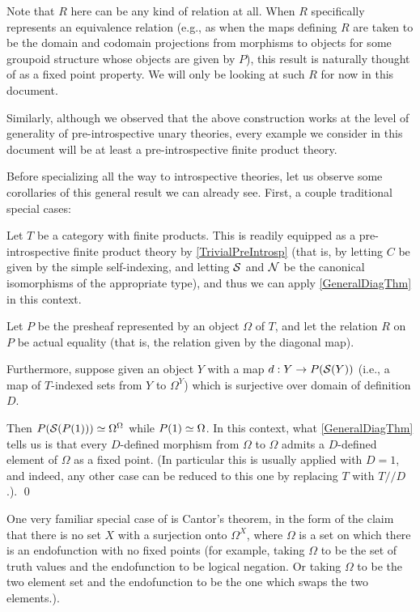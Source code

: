 Note that $R$ here can be any kind of relation at all. When $R$ specifically represents an equivalence relation (e.g., as when the maps defining $R$ are taken to be the domain and codomain projections from morphisms to objects for some groupoid structure whose objects are given by $P$), this result is naturally thought of as a fixed point property. We will only be looking at such $R$ for now in this document.

Similarly, although we observed that the above construction works at the level of generality of pre-introspective unary theories, every example we consider in this document will be at least a pre-introspective finite product theory.

Before specializing all the way to introspective theories, let us observe some corollaries of this general result we can already see. First, a couple traditional special cases:

\label{LawveresTheorem}
Let $T$ be a category with finite products. This is readily equipped as a pre-introspective finite product theory by \cref{TrivialPreIntrosp} (that is, by letting $C$ be given by the simple self-indexing, and letting $\mathcal{S}$ and $\mathcal{N}$ be the canonical isomorphisms of the appropriate type), and thus we can apply \cref{GeneralDiagThm} in this context.

Let $P$ be the presheaf represented by an object $\Omega$ of $T$, and let the relation $R$ on $P$ be actual equality (that is, the relation given by the diagonal map). 

Furthermore, suppose given an object $Y$ with a map $d : Y \to P(\mathcal{S}(Y))$ (i.e., a map of $T$-indexed sets from $Y$ to $\Omega^Y$) which is surjective over domain of definition $D$.

Then $P(\mathcal{S}(P(1))) \simeq \Omega^{\Omega}$ while $P(1) \simeq \Omega$. In this context, what \cref{GeneralDiagThm} tells us is that every $D$-defined morphism from $\Omega$ to $\Omega$ admits a $D$-defined element of $\Omega$ as a fixed point. (In particular this is usually applied with $D = 1$, and indeed, any other case can be reduced to this one by replacing $T$ with $T//D$.). \qed
{}

\label{CantorsTheorem}
One very familiar special case of  is Cantor's theorem, in the form of the claim that there is no set $X$ with a surjection onto $\Omega^X$, where $\Omega$ is a set on which there is an endofunction with no fixed points (for example, taking $\Omega$ to be the set of truth values and the endofunction to be logical negation. Or taking $\Omega$ to be the two element set and the endofunction to be the one which swaps the two elements.).

